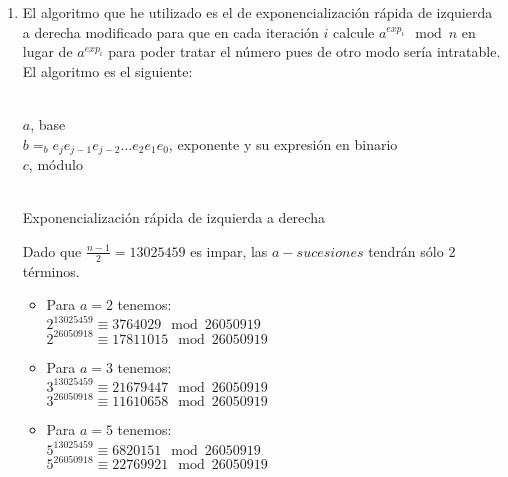 	\begin{enumerate}
		\item El algoritmo que he utilizado es el de exponencialización rápida de izquierda a derecha modificado
		para que en cada iteración $i$ calcule $a^{exp_i} \mod{n}$ en lugar de $a^{exp_i}$ para poder tratar el
		número pues de otro modo sería intratable. El algoritmo es el siguiente:
		\begin{algorithm}[H]
			\begin{algorithmic}[1]
				\REQUIRE \ \\
					\texttt{$a$}, base \\
					\texttt{$b =_b e_je_{j-1}e_{j-2}\dots e_2e_1e_0$}, exponente y su expresión en binario \\
					\texttt{$c$}, módulo\\ \
					\ENDIF
				\ENDWHILE
			\end{algorithmic}
			\caption{Exponencialización rápida de izquierda a derecha}
			\label{Fast-exp}
		\end{algorithm}
		
		Dado que $\displaystyle \frac{n-1}{2} = 13025459$ es impar, las $a-sucesiones$ tendrán sólo 2 términos.
		
		\begin{itemize}
			\item Para $a = 2$ tenemos:\\
				$2^{13025459} \equiv 3764029 \mod 26050919$\\
				$2^{26050918} \equiv 17811015 \mod 26050919$\\
				
			\item Para $a = 3$ tenemos:\\
				$3^{13025459} \equiv 21679447 \mod 26050919$\\
				$3^{26050918} \equiv 11610658 \mod 26050919$\\
				
			\item Para $a = 5$ tenemos:\\
				$5^{13025459} \equiv 6820151 \mod 26050919$\\
				$5^{26050918} \equiv 22769921 \mod 26050919$\\
				

\end{itemize}
\end{enumerate}
